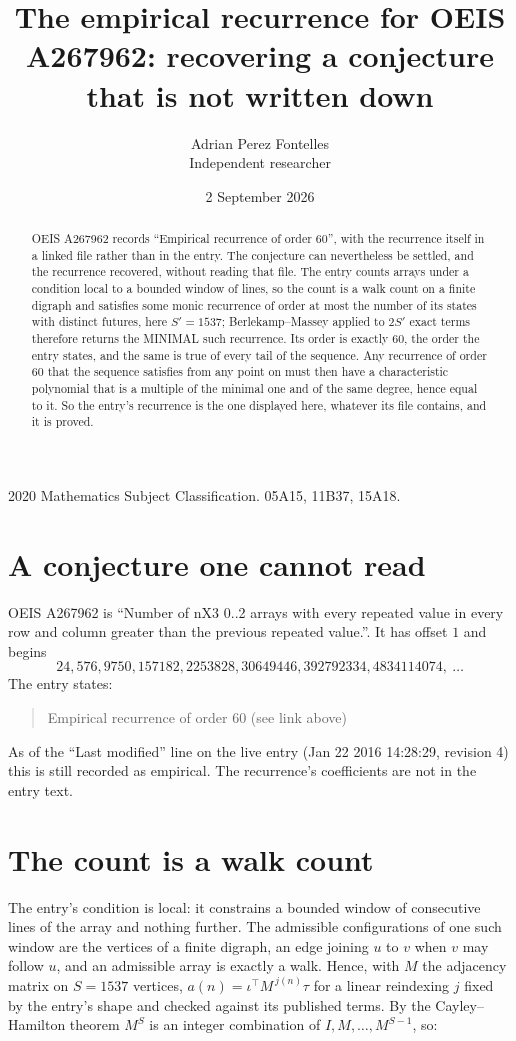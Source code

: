 \documentclass[11pt,a4paper]{article}
\title{The empirical recurrence for OEIS A267962: recovering a conjecture that is not written down}
\author{Adrian Perez Fontelles\\ \small Independent researcher}
\date{2 September 2026}
\theoremstyle{plain}
\theoremstyle{definition}
\begin{document}
\maketitle

\begin{abstract}
OEIS A267962 records ``Empirical recurrence of order $60$'', with the recurrence itself in a
linked file rather than in the entry. The conjecture can nevertheless be settled, and the
recurrence recovered, without reading that file. The entry counts arrays under a condition
local to a bounded window of lines, so the count is a walk count on a finite digraph and
satisfies some monic recurrence of order at most the number of its states with distinct
futures, here $S'=1537$; Berlekamp--Massey applied to $2S'$ exact
terms therefore returns the MINIMAL such recurrence. Its order is exactly $60$, the order
the entry states, and the same is true of every tail of the sequence. Any recurrence of order
$60$ that the sequence satisfies from any point on must then have a characteristic
polynomial that is a multiple of the minimal one and of the same degree, hence equal to it. So
the entry's recurrence is the one displayed here, whatever its file contains, and it is
proved.
\end{abstract}

\noindent\small 2020 Mathematics Subject Classification. 05A15, 11B37, 15A18.\normalsize

\section{A conjecture one cannot read}

OEIS A267962 is ``Number of nX3 0..2 arrays with every repeated value in every row and column greater than the previous repeated value.''. It has offset $1$ and begins
\[
24, 576, 9750, 157182, 2253828, 30649446, 392792334, 4834114074,\ \dots
\]
The entry states:
\begin{quote}
Empirical recurrence of order 60 (see link above)
\end{quote}
As of the ``Last modified'' line on the live entry (Jan 22 2016 14:28:29, revision 4) this is still
recorded as empirical. The recurrence's coefficients are not in the entry text.

\section{The count is a walk count}

The entry's condition is local: it constrains a bounded window of consecutive lines of the
array and nothing further. The admissible configurations of one such window are the vertices
of a finite digraph, an edge joining $u$ to $v$ when $v$ may follow $u$, and an admissible
array is exactly a walk. Hence, with $M$ the adjacency matrix on $S=1537$ vertices,
$a(n)=\iota^{\!\top}M^{\,j(n)}\tau$ for a linear reindexing $j$ fixed by the entry's shape
and checked against its published terms. By the Cayley--Hamilton theorem $M^{S}$ is an
integer combination of $I,M,\dots,M^{S-1}$, so:
\end{document}
